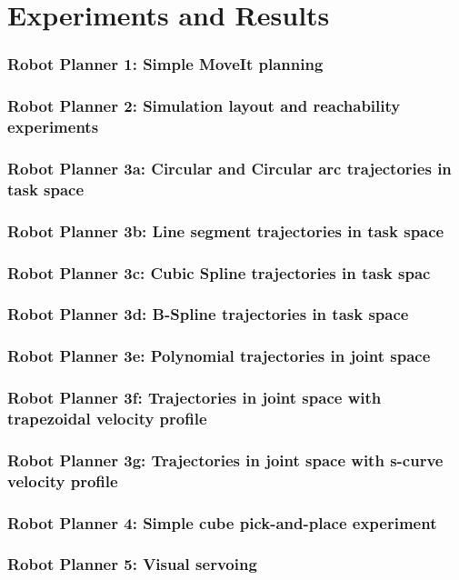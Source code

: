 \section{Experiments and Results}

\begin{frame}
\frametitle{Robot Planner 1: Simple MoveIt planning}
\end{frame}

\begin{frame}
\frametitle{Robot Planner 2: Simulation layout and reachability experiments}
\end{frame}

\begin{frame}
\frametitle{Robot Planner 3a: Circular and Circular arc trajectories in task space}
\end{frame}

\begin{frame}
\frametitle{Robot Planner 3b: Line segment trajectories in task space}
\end{frame}

\begin{frame}
\frametitle{Robot Planner 3c: Cubic Spline trajectories in task spac}
\end{frame}

\begin{frame}
\frametitle{Robot Planner 3d: B-Spline trajectories in task space}
\end{frame}

\begin{frame}
\frametitle{Robot Planner 3e: Polynomial trajectories in joint space}
\end{frame}

\begin{frame}
\frametitle{Robot Planner 3f: Trajectories in joint space with trapezoidal velocity profile}
\end{frame}

\begin{frame}
\frametitle{Robot Planner 3g: Trajectories in joint space with s-curve velocity profile}
\end{frame}

\begin{frame}
\frametitle{Robot Planner 4: Simple cube pick-and-place experiment}
\end{frame}

\begin{frame}
\frametitle{Robot Planner 5: Visual servoing}
\end{frame}